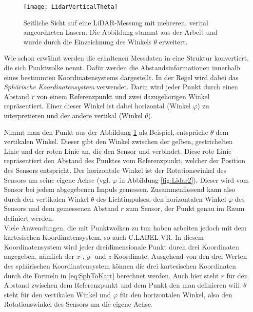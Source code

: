 \begin{figure}%
	\centering
    \texttt{[image: LidarVerticalTheta]}
    \caption{Seitliche Sicht auf eine LiDAR-Messung mit mehreren, verital angeordneten Lasern. Die Abbildung stammt aus der Arbeit \cite{bib:FastGroundSeg} und wurde durch die Einzeichnung des Winkels $\theta$ erweitert.}
    \label{fig:LidarVertical}
\end{figure}

Wie schon erwähnt werden die erhaltenen Messdaten in eine Struktur konvertiert, die sich Punktwolke nennt. Dafür werden die Abstandsinformationen innerhalb eines bestimmten Koordinatensystems dargestellt. In der Regel wird dabei das \textit{Sphärische Koordinatensystem} verwendet. Darin wird jeder Punkt durch einen Abstand $r$ von einem Referenzpunkt und zwei dazugehörigen Winkel repräsentiert. Einer dieser Winkel ist dabei horizontal (Winkel $\varphi$) zu interpretieren und der andere vertikal (Winkel $\theta$). 

Nimmt man den Punkt \grqq{} aus der Abbildung \ref{fig:LidarVertical} als Beispiel, entspräche $\theta$ dem vertikalen Winkel. Dieser gibt den Winkel zwischen der gelben, gestrichelten Linie und der roten Linie an, die den Sensor und \grqq{} verbindet. Diese rote Linie repräsentiert den Abstand des Punktes vom Referenzpunkt, welcher der Position des Sensors entspricht. Der horizontale Winkel ist der Rotationswinkel des Sensors um seine eigene Achse (vgl. $\varphi$ in Abbildung \ref {fig:Lidar2}). Dieser wird vom Sensor bei jedem abgegebenen Impuls gemessen. Zusammenfassend kann also durch den vertikalen Winkel $\theta$ des Lichtimpulses, den horizontalen Winkel $\varphi$ des Sensors und dem gemessenen Abstand $r$ zum Sensor, der Punkt \grqq{} genau im Raum definiert werden.\\

Viele Anwendungen, die mit Punktwolken zu tun haben arbeiten jedoch mit dem kartesischen Koordinatensystem, so auch C.LABEL-VR. In diesem Koordinatensystem wird jeder dreidimensionale Punkt durch drei Koordinaten angegeben, nämlich der $x$-, $y$- und $z$-Koordinate. Ausgehend von den drei Werten des sphärischen Koordinatensystem können die drei kartesischen Koordinaten durch die Formeln in \ref{eq:SphToKart} berechnet werden. Auch hier steht $r$ für den Abstand zwischen dem Referenzpunkt und dem Punkt den man definieren will. $\theta$ steht für den vertikalen Winkel und $\varphi$ für den horizontalen Winkel, also den Rotationswinkel des Sensors um die eigene Achse.

